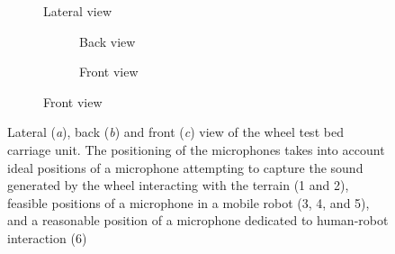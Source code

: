 \begin{figure}
    \begin{subfigure}{.57\linewidth}
        \centering
        
        \caption{Lateral view}
        \label{fig:wheeltestbed-setup-2-lateral}
    \end{subfigure}
    \hfill
    \begin{subfigure}{.40\linewidth}
        \begin{subfigure}{\linewidth}
            \centering
            
            \caption{Back view}
            \label{fig:wheeltestbed-setup-2-back}
        \end{subfigure}
        \bigskip
        
        \begin{subfigure}{\linewidth}
            \centering
            
            \caption{Front view}
            \label{fig:wheeltestbed-setup-2-front}
        \end{subfigure}
    \end{subfigure}
    \caption{Lateral (\emph{a}), back (\emph{b}) and front (\emph{c}) view of
    the wheel test bed carriage unit. The positioning of the microphones takes
    into account ideal positions of a microphone attempting to capture the
    sound generated by the wheel interacting with the terrain (1 and 2),
    feasible positions of a microphone in a mobile robot (3, 4, and 5), and a
    reasonable position of a microphone dedicated to human-robot interaction
    (6)}
    \label{fig:wheeltestbed-setup-2}
\end{figure}



